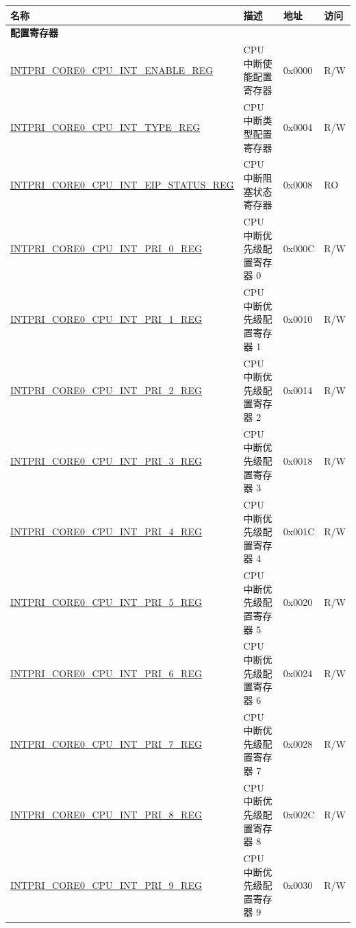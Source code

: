 \begin{longtable}{ | p{10cm} | p{10cm} | p{1.3cm} | p{1cm} | }
\hline\rowcolor{lightgray}
\textbf{名称} & \textbf{描述} &  \textbf{地址} & \textbf{访问} \\ \hline
\endhead
\multicolumn{4}{|l|}{\textbf{配置寄存器}} \\ \hline
\hyperref[regdesc:INTPRICORE0CPUINTENABLEREG]{INTPRI\_CORE0\_CPU\_INT\_ENABLE\_REG} & CPU 中断使能配置寄存器 & 0x0000 & R/W \\ \hline
\hyperref[regdesc:INTPRICORE0CPUINTTYPEREG]{INTPRI\_CORE0\_CPU\_INT\_TYPE\_REG} & CPU 中断类型配置寄存器 & 0x0004 & R/W \\ \hline
\hyperref[regdesc:INTPRICORE0CPUINTEIPSTATUSREG]{INTPRI\_CORE0\_CPU\_INT\_EIP\_STATUS\_REG} & CPU 中断阻塞状态寄存器 & 0x0008 & RO \\ \hline
\hyperref[regdesc:INTPRICORE0CPUINTPRINREG]{INTPRI\_CORE0\_CPU\_INT\_PRI\_0\_REG} & CPU 中断优先级配置寄存器 0 & 0x000C & R/W \\ \hline
\hyperref[regdesc:INTPRICORE0CPUINTPRINREG]{INTPRI\_CORE0\_CPU\_INT\_PRI\_1\_REG} & CPU 中断优先级配置寄存器 1 & 0x0010 & R/W \\ \hline
\hyperref[regdesc:INTPRICORE0CPUINTPRINREG]{INTPRI\_CORE0\_CPU\_INT\_PRI\_2\_REG} & CPU 中断优先级配置寄存器 2 & 0x0014 & R/W \\ \hline
\hyperref[regdesc:INTPRICORE0CPUINTPRINREG]{INTPRI\_CORE0\_CPU\_INT\_PRI\_3\_REG} & CPU 中断优先级配置寄存器 3 & 0x0018 & R/W \\ \hline
\hyperref[regdesc:INTPRICORE0CPUINTPRINREG]{INTPRI\_CORE0\_CPU\_INT\_PRI\_4\_REG} & CPU 中断优先级配置寄存器 4 & 0x001C & R/W \\ \hline
\hyperref[regdesc:INTPRICORE0CPUINTPRINREG]{INTPRI\_CORE0\_CPU\_INT\_PRI\_5\_REG} & CPU 中断优先级配置寄存器 5 & 0x0020 & R/W \\ \hline
\hyperref[regdesc:INTPRICORE0CPUINTPRINREG]{INTPRI\_CORE0\_CPU\_INT\_PRI\_6\_REG} & CPU 中断优先级配置寄存器 6 & 0x0024 & R/W \\ \hline
\hyperref[regdesc:INTPRICORE0CPUINTPRINREG]{INTPRI\_CORE0\_CPU\_INT\_PRI\_7\_REG} & CPU 中断优先级配置寄存器 7 & 0x0028 & R/W \\ \hline
\hyperref[regdesc:INTPRICORE0CPUINTPRINREG]{INTPRI\_CORE0\_CPU\_INT\_PRI\_8\_REG} & CPU 中断优先级配置寄存器 8 & 0x002C & R/W \\ \hline
\hyperref[regdesc:INTPRICORE0CPUINTPRINREG]{INTPRI\_CORE0\_CPU\_INT\_PRI\_9\_REG} & CPU 中断优先级配置寄存器 9 & 0x0030 & R/W \\ \hline

\end{longtable}

